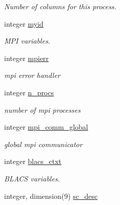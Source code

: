 \begin{DoxyCompactItemize}
\begin{DoxyCompactList}\small\item\em Number of columns for this process. \end{DoxyCompactList}\item 
integer \hyperlink{namespacedimensions_a5f4a3aff006de1bb6f79bca467cad6f4}{myid}
\begin{DoxyCompactList}\small\item\em M\+P\+I variables. \end{DoxyCompactList}\item 
\hypertarget{namespacedimensions_aecaa2a448652feb6b6dfee507e29fde7}{}integer \hyperlink{namespacedimensions_aecaa2a448652feb6b6dfee507e29fde7}{mpierr}\label{namespacedimensions_aecaa2a448652feb6b6dfee507e29fde7}

\begin{DoxyCompactList}\small\item\em mpi error handler \end{DoxyCompactList}\item 
\hypertarget{namespacedimensions_a8e0d15637b6f6e27a2a0a2bddedd7a35}{}integer \hyperlink{namespacedimensions_a8e0d15637b6f6e27a2a0a2bddedd7a35}{n\+\_\+procs}\label{namespacedimensions_a8e0d15637b6f6e27a2a0a2bddedd7a35}

\begin{DoxyCompactList}\small\item\em number of mpi processes \end{DoxyCompactList}\item 
\hypertarget{namespacedimensions_adc63ab2f85f557768df7c673f1363d21}{}integer \hyperlink{namespacedimensions_adc63ab2f85f557768df7c673f1363d21}{mpi\+\_\+comm\+\_\+global}\label{namespacedimensions_adc63ab2f85f557768df7c673f1363d21}

\begin{DoxyCompactList}\small\item\em global mpi communicator \end{DoxyCompactList}\item 
integer \hyperlink{namespacedimensions_a3db5b35c702a41e8491992c968e690ae}{blacs\+\_\+ctxt}
\begin{DoxyCompactList}\small\item\em B\+L\+A\+C\+S variables. \end{DoxyCompactList}\item 
\hypertarget{namespacedimensions_ad807ffb6f917405a4e09dfd2c8b86ede}{}integer, dimension(9) \hyperlink{namespacedimensions_ad807ffb6f917405a4e09dfd2c8b86ede}{sc\+\_\+desc}\label{namespacedimensions_ad807ffb6f917405a4e09dfd2c8b86ede}


\end{DoxyCompactItemize}
